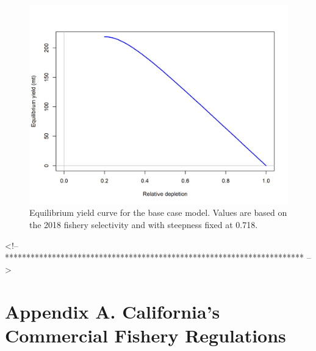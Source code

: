 \documentclass[12pt,]{article}
\begin{document}
\begin{figure}
\centering
\includegraphics{r4ss/plots_mod1/yield1_yield_curve.png}
\caption{Equilibrium yield curve for the base case model. Values are
based on the 2018 fishery selectivity and with steepness fixed at 0.718.
\label{fig:yield1_yield_curve}}
\end{figure}

\FloatBarrier
<!-- ********************************************************************** -->

\FloatBarrier
\newpage

\hypertarget{appendix-a.-californias-commercial-fishery-regulations}{\section*{Appendix
A. California's Commercial Fishery
Regulations}\label{appendix-a.-californias-commercial-fishery-regulations}}

\renewcommand{\thepage}{A-\arabic{page}}
\renewcommand{\thefigure}{A\arabic{figure}}

\setcounter{page}{1} \setcounter{figure}{1}
\end{document}
